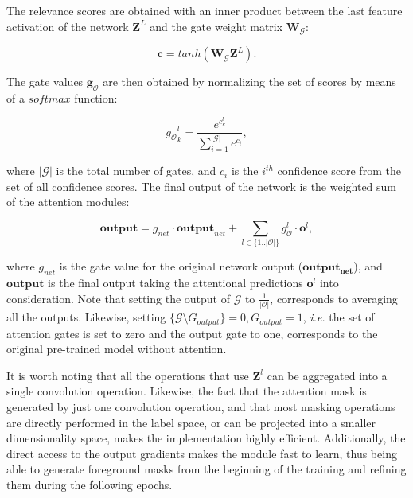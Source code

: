\documentclass[runningheads]{llncs}
\begin{document}
The relevance scores are obtained with an inner product between the last feature activation of the network $\mathbf{Z}^L$ and the gate weight matrix $\mathbf{W}_\mathcal{G}$:

\begin{equation}
\label{eq:scores}
\mathbf{c} = tanh(\mathbf{W_\mathcal{G}}\mathbf{Z}^L).
\end{equation}

The gate values $\mathbf{g_\mathcal{O}}$ are then obtained by normalizing the set of scores by means of a $softmax$ function:

\begin{equation}
\label{eq:gates}
{g_\mathcal{O}}^l_k = \frac{e^{c^l_k}}{\sum_{i = 1}^{|\mathcal{G}|} e^{c_i}},
\end{equation}

where $|\mathcal{G}|$ is the total number of gates, and $c_i$ is the $i^{th}$ confidence score from the set of all confidence scores. The final output of the network is the weighted sum of the attention modules: 

\begin{equation}
\label{eq:all}
\mathbf{output} = g_{net} \cdot \mathbf{output}_{net} + \sum_{l \in \{1..|\mathcal{O}|\}} g_\mathcal{O}^l \cdot \mathbf{o}^l,
\end{equation}

where $g_{net}$ is the gate value for the original network output ($\mathbf{output_{net}}$), and $\mathbf{output}$ is the final output taking the attentional predictions $\mathbf{o}^l$ into consideration. Note that setting the output of $\mathcal{G}$ to $\frac{1}{|\mathcal{O}|}$, corresponds to averaging all the outputs. Likewise, setting $\{\mathcal{G} \setminus G_{output}\} = 0, G_{output} = 1$, \emph{i.e.} the set of attention gates is set to zero and the output gate to one, corresponds to the original pre-trained model without attention.

It is worth noting that all the operations that use $\mathbf{Z}^l$ can be aggregated into a single convolution operation. Likewise, the fact that the attention mask is generated by just one convolution operation, and that most masking operations are directly performed in the label space, or can be projected into a smaller dimensionality space, makes the implementation highly efficient. Additionally, the direct access to the output gradients makes the module fast to learn, thus being able to generate foreground masks from the beginning of the training and refining them during the following epochs. 
\end{document}
